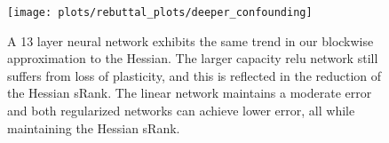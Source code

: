 \begin{figure}[h!]
  \centering
\texttt{[image: plots/rebuttal\_plots/deeper\_confounding]}
  \caption{
      A 13 layer neural network exhibits the same trend in our blockwise approximation to the Hessian.
      The larger capacity relu network still suffers from loss of plasticity, and this is reflected in the reduction of the Hessian sRank.
      The linear network maintains a moderate error and both regularized networks can achieve lower error, all while maintaining the Hessian sRank.
  }
  \label{fig:deeper}
\end{figure}


